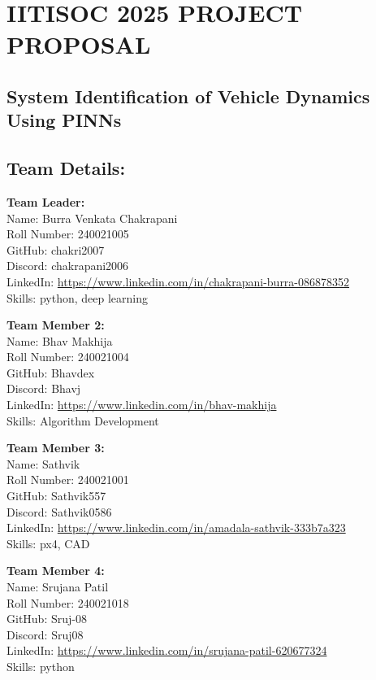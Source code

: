 \documentclass{article}
\begin{document}
\section*{IITISOC 2025 PROJECT PROPOSAL}
\subsection*{System Identification of Vehicle Dynamics Using PINNs}

\subsection*{Team Details:}

\textbf{Team Leader:} \\
Name: Burra Venkata Chakrapani \\
Roll Number: 240021005 \\
GitHub: chakri2007 \\
Discord: chakrapani2006 \\
LinkedIn: \url{https://www.linkedin.com/in/chakrapani-burra-086878352} \\
Skills: python, deep learning

\vspace{1em}
\textbf{Team Member 2:} \\
Name: Bhav Makhija \\
Roll Number: 240021004 \\
GitHub: Bhavdex \\
Discord: Bhavj \\
LinkedIn: \url{https://www.linkedin.com/in/bhav-makhija} \\
Skills: Algorithm Development

\vspace{1em}
\textbf{Team Member 3:} \\
Name: Sathvik \\
Roll Number: 240021001 \\
GitHub: Sathvik557 \\
Discord: Sathvik0586 \\
LinkedIn: \url{https://www.linkedin.com/in/amadala-sathvik-333b7a323} \\
Skills: px4, CAD

\vspace{1em}
\textbf{Team Member 4:} \\
Name: Srujana Patil \\
Roll Number: 240021018 \\
GitHub: Sruj-08 \\
Discord: Sruj08 \\
LinkedIn: \url{https://www.linkedin.com/in/srujana-patil-620677324} \\
Skills: python
\end{document}
